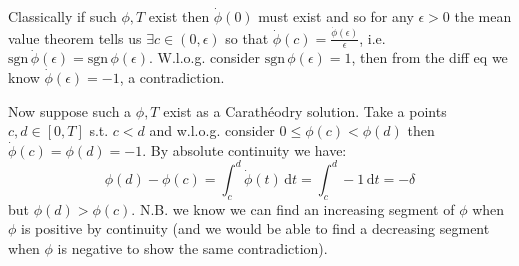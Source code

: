 \documentclass{article}
\newenvironment{ex}[1]
  {\renewcommand\theexercise{#1}\exercise}
  {\endexercise}
\newcommand{\ud}{\,\mathrm{d}}
\newcommand{\cara}{Carath\'eodry\xspace}
\begin{document}
\begin{ex}{1.9}
  Classically if such $\phi, T$ exist then $\dot{\phi}(0)$ must exist and so for any $\epsilon > 0$ the mean value theorem tells us $\exists c \in (0, \epsilon)$ so that $\dot{\phi}(c) = \frac{\dot{\phi}(\epsilon)}{\epsilon}$, i.e. $\mathrm{sgn}\, \dot{\phi}(\epsilon) = \mathrm{sgn}\, \phi(\epsilon)$. W.l.o.g. consider $\mathrm{sgn}\,\phi(\epsilon) = 1$, then from the diff eq we know $\dot{\phi}(\epsilon) = -1$, a contradiction.

  Now suppose such a $\phi, T$ exist as a \cara solution. Take a points $c, d \in [0, T]$ s.t. $c < d$ and w.l.o.g. consider $0 \le \phi(c) < \phi(d)$ then $\dot{\phi}(c) = \phi(d) = -1$. By absolute continuity we have:
  $$
  \phi(d) - \phi(c) = \int_{c}^{d} \dot{\phi}(t) \ud t = \int_{c}^{d} -1 \ud t = - \delta
  $$
  but $\phi(d) > \phi(c)$. N.B. we know we can find an increasing segment of $\phi$ when $\phi$ is positive by continuity (and we would be able to find a decreasing segment when $\phi$ is negative to show the same contradiction).
\end{ex}
\end{document}
